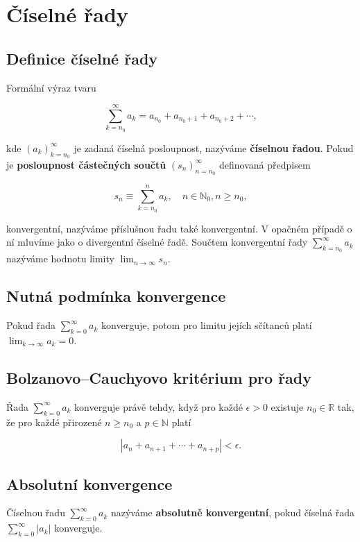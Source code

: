 \section{Číselné řady}

\subsection*{Definice číselné řady}

Formální výraz tvaru

\[ \sum_{k=n_0}^\infty a_k = a_{n_0} + a_{n_0 + 1} + a_{n_0 + 2} + \cdots, \]

\noindent kde $(a_k)_{k=n_0}^\infty$ je zadaná číselná posloupnost, nazýváme \textbf{číselnou
    řadou}. Pokud je \textbf{posloupnost částečných součtů}
$(s_n)_{n=n_0}^\infty$ definovaná předpisem

\[ s_n \equiv \sum_{k=n_0}^n a_k, \quad n\in\mathbb{N}_0, n \geq n_0, \]

\noindent konvergentní, nazýváme příslušnou řadu také konvergentní. V opačném
případě o ní mluvíme jako o divergentní číselné řadě.
Součtem konvergentní řady $\sum_{k=n_0}^\infty a_k$ nazýváme hodnotu
limity $\displaystyle\lim_{n\to\infty} s_n$.

\subsection*{Nutná podmínka konvergence}

Pokud řada $\sum_{k=0}^\infty a_k$ konverguje, potom pro limitu jejích sčítanců
platí $\displaystyle \lim_{k\to\infty} a_k = 0$.

\subsection*{Bolzanovo--Cauchyovo kritérium pro řady}

Řada $\displaystyle\sum_{k=0}^\infty a_k$ konverguje právě tehdy, když pro každé $\epsilon > 0$ existuje $n_0 \in \mathbb{R}$ tak, že pro každé přirozené $n \geq n_0$ a $p \in \mathbb{N}$ platí

\[ |a_n + a_{n+1} + \cdots + a_{n+p}| < \epsilon. \]

\subsection*{Absolutní konvergence}

Číselnou řadu $\sum_{k=0}^\infty a_k$ nazýváme \textbf{absolutně konvergentní}, pokud číselná řada $\sum_{k=0}^\infty |a_k|$ konverguje.

